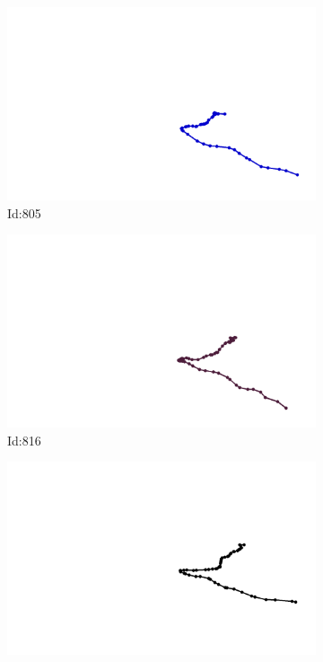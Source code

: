 \documentclass[12pt,twoside]{report}
\begin{document}
\begin{figure}
\begin{subfigure}[b]{0.20\textwidth}
\centering
\includegraphics[width=\textwidth]{../trajectories/805.png}
\caption{Id:805}
\end{subfigure}
\begin{subfigure}[b]{0.20\textwidth}
\centering
\includegraphics[width=\textwidth]{../trajectories/816.png}
\caption{Id:816}
\end{subfigure}
\begin{subfigure}[b]{0.20\textwidth}
\centering
\includegraphics[width=\textwidth]{../trajectories/822.png}

\end{subfigure}
\end{figure}
\end{document}
